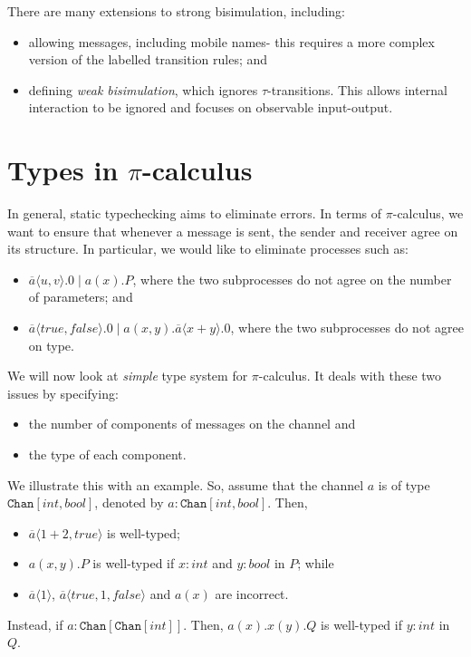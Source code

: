 \documentclass[a4paper, openany]{memoir}
\theoremstyle{definition}
\begin{document}
    There are many extensions to strong bisimulation, including:
    \begin{itemize}
        \item allowing messages, including mobile names- this requires a more complex version of the labelled transition rules; and
        \item defining \emph{weak bisimulation}, which ignores $\tau$-transitions. This allows internal interaction to be ignored and focuses on observable input-output.
    \end{itemize}
    \newpage

    \section{Types in $\pi$-calculus}
    In general, static typechecking aims to eliminate errors. In terms of $\pi$-calculus, we want to ensure that whenever a message is sent, the sender and receiver agree on its structure. In particular, we would like to eliminate processes such as:
    \begin{itemize}
        \item $\overline{a} \langle u, v \rangle.0 \mid a(x).P$, where the two subprocesses do not agree on the number of parameters; and
        \item $\overline{a} \langle \textit{true}, \textit{false} \rangle.0 \mid a(x, y).\overline{a} \langle x + y \rangle.0$, where the two subprocesses do not agree on type.
    \end{itemize}

    We will now look at \emph{simple} type system for $\pi$-calculus. It deals with these two issues by specifying:
    \begin{itemize}
        \item the number of components of messages on the channel and
        \item the type of each component.
    \end{itemize}
    We illustrate this with an example. So, assume that the channel $a$ is of type $\texttt{Chan}[\textit{int}, \textit{bool}]$, denoted by $a \colon \texttt{Chan}[\textit{int}, \textit{bool}]$. Then,
    \begin{itemize}
        \item $\overline{a} \langle 1 + 2, \textit{true} \rangle$ is well-typed;
        \item $a(x, y).P$ is well-typed if $x \colon \textit{int}$ and $y \colon \textit{bool}$ in $P$; while
        \item $\overline{a} \langle 1 \rangle$, $\overline{a} \langle true, 1, false \rangle$ and $a(x)$ are incorrect.
    \end{itemize}
    Instead, if $a \colon \texttt{Chan}[\texttt{Chan}[\textit{int}]]$. Then, $a(x).x(y).Q$ is well-typed if $y \colon \textit{int}$ in $Q$.
\end{document}
